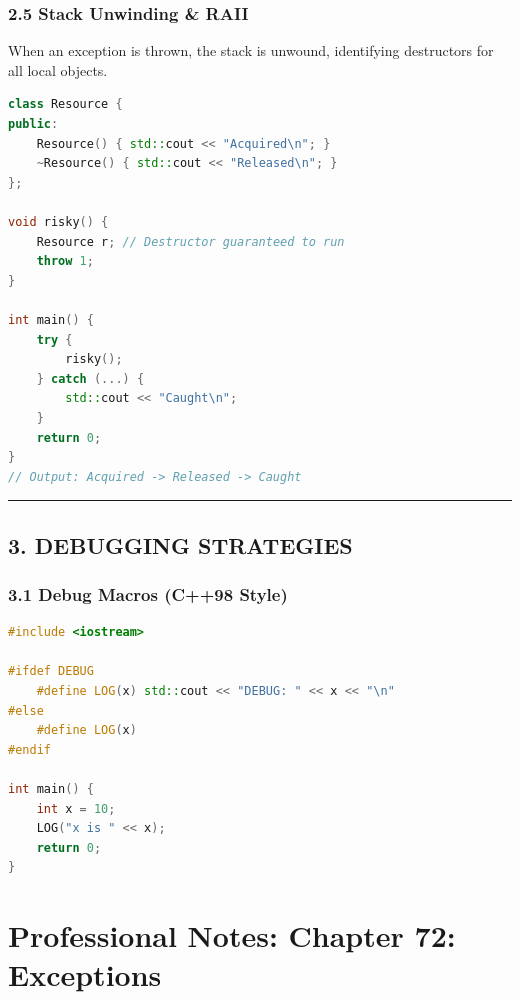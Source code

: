 \hypertarget{stack-unwinding-raii}{%
\subsubsection{2.5 Stack Unwinding \& RAII}\label{stack-unwinding-raii}}

When an exception is thrown, the stack is unwound, identifying
destructors for all local objects.

\begin{lstlisting}[language={C++}]
class Resource {
public:
    Resource() { std::cout << "Acquired\n"; }
    ~Resource() { std::cout << "Released\n"; }
};

void risky() {
    Resource r; // Destructor guaranteed to run
    throw 1;
}

int main() {
    try {
        risky();
    } catch (...) {
        std::cout << "Caught\n";
    }
    return 0;
}
// Output: Acquired -> Released -> Caught
\end{lstlisting}

\begin{center}\rule{0.5\linewidth}{0.5pt}\end{center}

\hypertarget{debugging-strategies}{%
\subsection{3. DEBUGGING STRATEGIES}\label{debugging-strategies}}

\hypertarget{debug-macros-c98-style}{%
\subsubsection{3.1 Debug Macros (C++98
Style)}\label{debug-macros-c98-style}}

\begin{lstlisting}[language={C++}]
#include <iostream>

#ifdef DEBUG
    #define LOG(x) std::cout << "DEBUG: " << x << "\n"
#else
    #define LOG(x)
#endif

int main() {
    int x = 10;
    LOG("x is " << x);
    return 0;
}
\end{lstlisting}

\hypertarget{professional-notes-chapter-72-exceptions}{%
\section{Professional Notes: Chapter 72:
Exceptions}\label{professional-notes-chapter-72-exceptions}}

